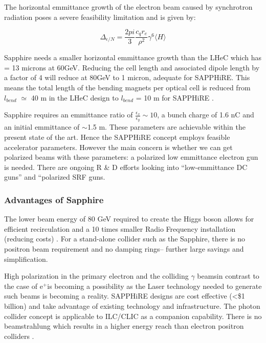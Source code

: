The horizontal emmittance growth of the electron beam caused by synchrotron radiation poses a severe feasibility limitation and is given by:

\begin{equation}
\Delta_{\epsilon/N}=\frac{2pi}{3}\frac{c_{q}r_{e}}{\rho^{2}}\gamma^{6}\langle H \rangle
\end{equation}

Sapphire needs a smaller horizontal emmittance growth than the LHeC which has  = 13 microns at 60GeV.  Reducing the cell length and associated dipole length by a factor of 4 will reduce  at 80GeV to 1 micron, adequate for SAPPHiRE. This means the total length of the bending magnets per optical cell is reduced from $l_{bend}$ $\simeq$ 40 m in the LHeC design to $l_{bend}$ = 10 m for SAPPHiRE \cite{Bogacz:SAPPHiRE}.

Sapphire requires an emmittance ratio of $\frac{\epsilon_{x}}{\epsilon_{y}} \sim 10$, a bunch charge of 1.6 nC and an initial emmittance of $\sim$1.5 \textmu m. These parameters are achievable within the present state of the art. Hence the SAPPHiRE concept employs feasible accelerator parameters. However the main concern is whether we can get polarized beams with these parameters: a polarized low emmittance electron gun is needed. There are ongoing R \& D efforts looking into ``low-emmittance DC guns'' and ``polarized SRF guns. \cite{Zimmermann:SAPPHiRE}

\subsubsection{Advantages of Sapphire}                                                                                                              The lower beam energy of 80 GeV required to create the Higgs boson allows for efficient recirculation and a 10 times smaller Radio Frequency installation (reducing costs) \cite{Bogacz:SAPPHiRE}. For a stand-alone collider such as the Sapphire, there is no positron beam requirement and no damping rings– further large savings and simplification.

High polarization in the primary electron and the colliding $\gamma$ beams\textemdash in contrast to the case of e$^{+}$\textemdash is becoming a possibility as the Laser technology needed to generate such beams is becoming a reality. SAPPHiRE designs are cost effective (\textless \$1 billion) and take advantage of existing technology and infrastructure. The photon collider concept is applicable to ILC/CLIC as a companion capability. There is no beamstrahlung which results in a higher energy reach than electron positron colliders \cite{Zimmermann:SAPPHiRE}.

